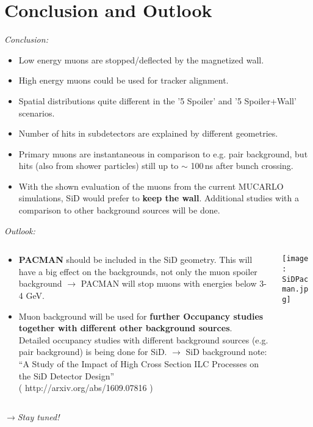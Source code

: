 \documentclass[xcolor={dvipsnames}]{beamer}
\begin{document}
\section{Conclusion and Outlook}
\begin{frame}
\textit{Conclusion:}
\begin{itemize}
\item Low energy muons are stopped/deflected by the magnetized wall.
\item High energy muons could be used for tracker alignment.
\item Spatial distributions quite different in the '5 Spoiler' and '5 Spoiler+Wall' scenarios.
\item Number of hits in subdetectors are explained by different geometries.
\item Primary muons are instantaneous in comparison to e.g. pair background, but hits (also from shower particles) still up to $\sim$ 100\,ns after bunch crossing.
\item \alert{With the shown evaluation of the muons from the current MUCARLO simulations, SiD would prefer to \textbf{keep the wall}. Additional studies with a comparison to other background sources will be done.}
\end{itemize}
\end{frame}
\begin{frame}
\textit{Outlook:}
\begin{columns}
 \begin{column}{0.65\textwidth}
  \begin{itemize}
\item \textbf{PACMAN} should be included in the SiD geometry.
This will have a big effect on the backgrounds, not only the muon spoiler background $\rightarrow$ PACMAN will stop muons with energies below 3-4 GeV.
\item Muon background will be used for \textbf{further Occupancy studies together with different other background sources}.\\
\small Detailed occupancy studies with different background sources (e.g. pair background) is being done for SiD. $\rightarrow$ SiD background note: ``A Study of the Impact of High Cross Section ILC Processes on the SiD Detector Design''\\( http://arxiv.org/abs/1609.07816 )
\end{itemize}
 \end{column}
 \begin{column}{0.35\textwidth}
  \texttt{[image: SiDPacman.jpg]}
 \end{column}
\end{columns}
\vspace*{0.2cm}
\alert{
$\rightarrow$\textit{Stay tuned!}}
\end{frame}
\end{document}
